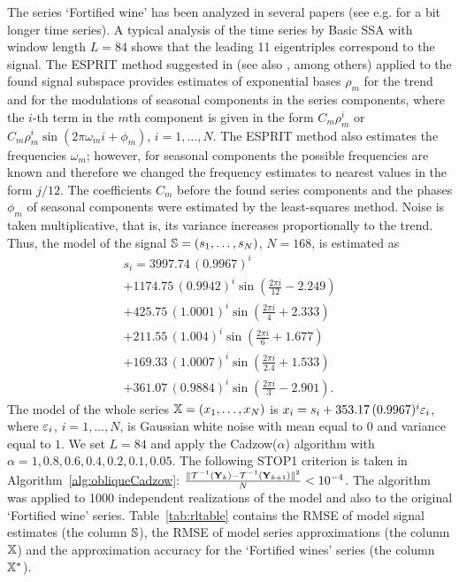\documentclass[sii]{ipart}
\begin{document}
The series `Fortified wine' has been analyzed in several papers (see e.g. \cite{Golyandina.etal2015} for a bit longer time series).
A typical analysis of the time series by Basic SSA
\cite[Chapter 1]{Golyandina.etal2001}
with window length $L=84$ shows that the leading 11 eigentriples
correspond to the signal. The ESPRIT method suggested in \cite{Roy.Kailath1989} (see also \cite[Section 2.8.2]{Golyandina.Zhigljavsky2012}, among others) applied to the found signal subspace provides
estimates of exponential bases $\rho_m$ for the trend and for the modulations of seasonal components in the series components, where the $i$-th term in the $m$th component is given in the form $C_m \rho_m^i$ or $C_m \rho_m^i \sin(2\pi\omega_m i +\phi_m)$, $i=1,\ldots,N$. The ESPRIT method also estimates the frequencies $\omega_m$; however, for seasonal components the possible frequencies are known and therefore we changed the frequency estimates to  nearest values in the form $j/12$.
The coefficients $C_m$ before the found series components and the phases $\phi_m$ of seasonal components were estimated by
the least-squares method. Noise is taken multiplicative, that is, its variance increases proportionally to the trend.
Thus, the model of the signal $\mathbb{S} = (s_{1}, \ldots, s_N)$, $N=168$, is estimated as
\begin{multline*}
s_{i} = 3997.74\, (0.9967)^i \\ +
1174.75\, (0.9942)^i \sin(\frac{2\pi i}{12} - 2.249) \\ +
425.75\, (1.0001)^i \sin(\frac{2\pi i}{4} + 2.333)  \\  +
211.55\, (1.004)^i \sin(\frac{2\pi i}{6} + 1.677)  \\ +
169.33\, (1.0007)^i \sin(\frac{2 \pi i}{2.4} + 1.533)  \\ +
361.07\, (0.9884)^i \sin(\frac{2 \pi i}{3} - 2.901).
\end{multline*}
The model of the whole series $\mathbb{X}=(x_1,\ldots,x_N)$ is
$x_i=s_i + 353.17\, (0.9967)^i \varepsilon_i$,
where  $\varepsilon_i$, $i=1,\ldots,N$,  is Gaussian white noise with mean equal to $0$ and variance equal to $1$.
We set $L=84$ and apply the Cadzow($\alpha$) algorithm with $\alpha=1, 0.8, 0.6, 0.4, 0.2, 0.1, 0.05$.
The following STOP1 criterion is taken in Algorithm~\ref{alg:obliqueCadzow}:
$\frac{\|\mathcal{T}^{-1}(\mathbf{Y}_k) - \mathcal{T}^{-1}(\mathbf{Y}_{k + 1})\|^2}{N} < 10^{-4}$.
The algorithm was applied to 1000 independent realizations of the model and also to the original `Fortified wine' series.
Table~\ref{tab:rltable} contains the RMSE of model signal estimates (the column $\mathbb{S}$),
the RMSE of model series approximations (the column $\mathbb{X}$) and the approximation accuracy for the
`Fortified wines' series (the column $\mathbb{X}^*$).
\end{document}
